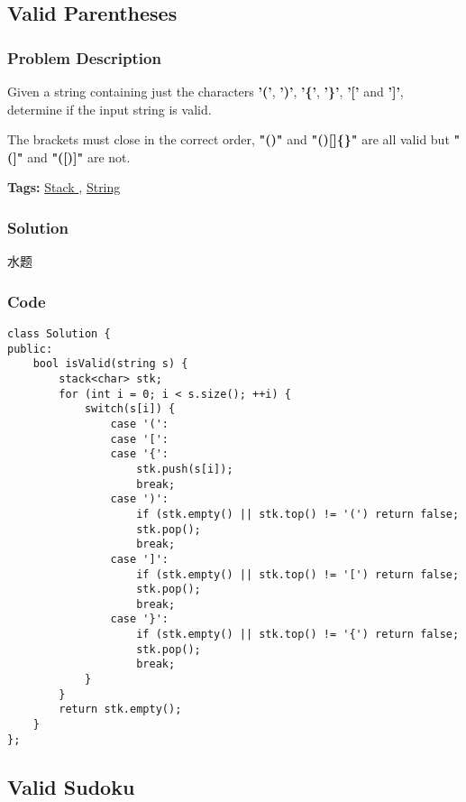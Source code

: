 \documentclass{article}
\begin{document}
\begin{CJK*}{UTF8}{gkai}
\subsection{ Valid Parentheses }
\label{ Valid Parentheses }

\subsubsection*{Problem Description}
Given a string containing just the characters \textbf{'('}, \textbf{')'}, \textbf{'\{'}, \textbf{'\}'}, \textbf{'['} and \textbf{']'}, determine if the input string is valid.

The brackets must close in the correct order, \textbf{"()"} and \textbf{"()[]\{\}"} are all valid but \textbf{"(]"} and \textbf{"([)]"} are not.


\textbf{Tags: }
\hyperref[ Stack ]{ Stack },  \hyperref[ String ]{ String }



\subsubsection*{Solution}
水题

\subsubsection*{Code}
\begin{lstlisting}
class Solution {
public:
    bool isValid(string s) {
        stack<char> stk;
        for (int i = 0; i < s.size(); ++i) {
            switch(s[i]) {
                case '(':
                case '[':
                case '{':
                    stk.push(s[i]);
                    break;
                case ')':
                    if (stk.empty() || stk.top() != '(') return false;
                    stk.pop();
                    break;
                case ']':
                    if (stk.empty() || stk.top() != '[') return false;
                    stk.pop();
                    break;
                case '}':
                    if (stk.empty() || stk.top() != '{') return false;
                    stk.pop();
                    break;
            }
        }
        return stk.empty();
    }
}; 
\end{lstlisting}


\subsection{ Valid Sudoku }
\label{ Valid Sudoku }


\end{CJK*}
\end{document}
